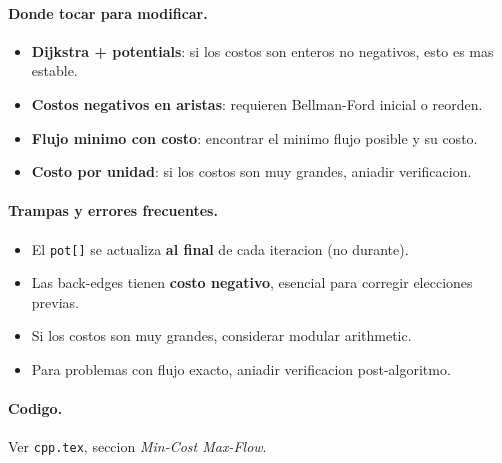 \paragraph{Donde tocar para modificar.}
\begin{itemize}\setlength\itemsep{0pt}
	\item \textbf{Dijkstra + potentials}: si los costos son enteros no negativos, esto es mas estable.
	\item \textbf{Costos negativos en aristas}: requieren Bellman-Ford inicial o reorden.
	\item \textbf{Flujo minimo con costo}: encontrar el minimo flujo posible y su costo.
	\item \textbf{Costo por unidad}: si los costos son muy grandes, aniadir verificacion.
\end{itemize}

\paragraph{Trampas y errores frecuentes.}
\begin{itemize}\setlength\itemsep{0pt}
	\item El \texttt{pot[]} se actualiza \textbf{al final} de cada iteracion (no durante).
	\item Las back-edges tienen \textbf{costo negativo}, esencial para corregir elecciones previas.
	\item Si los costos son muy grandes, considerar modular arithmetic.
	\item Para problemas con flujo exacto, aniadir verificacion post-algoritmo.
\end{itemize}

\paragraph{Codigo.}
Ver \texttt{cpp.tex}, seccion \textit{Min-Cost Max-Flow}.
